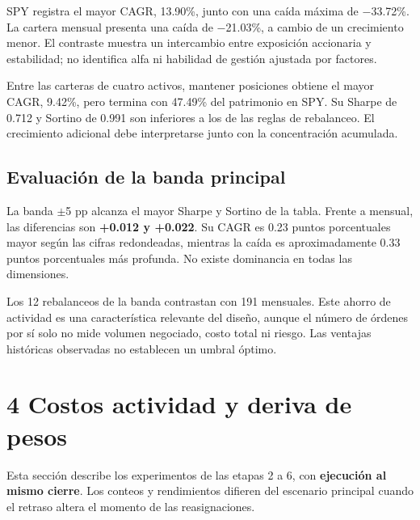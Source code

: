 \documentclass[11pt,letterpaper]{article}
\begin{document}
SPY registra el mayor CAGR, 13.90\%, junto con una caída máxima de \ensuremath{-}33.72\%. La cartera mensual presenta una caída de \ensuremath{-}21.03\%, a cambio de un crecimiento menor. El contraste muestra un intercambio entre exposición accionaria y estabilidad; no identifica alfa ni habilidad de gestión ajustada por factores.

Entre las carteras de cuatro activos, mantener posiciones obtiene el mayor CAGR, 9.42\%, pero termina con 47.49\% del patrimonio en SPY. Su Sharpe de 0.712 y Sortino de 0.991 son inferiores a los de las reglas de rebalanceo. El crecimiento adicional debe interpretarse junto con la concentración acumulada.

\subsection*{Evaluación de la banda principal}

La banda \ensuremath{\pm}5 pp alcanza el mayor Sharpe y Sortino de la tabla. Frente a mensual, las diferencias son \textbf{+0.012 y +0.022}. Su CAGR es 0.23 puntos porcentuales mayor según las cifras redondeadas, mientras la caída es aproximadamente 0.33 puntos porcentuales más profunda. No existe dominancia en todas las dimensiones.

Los 12 rebalanceos de la banda contrastan con 191 mensuales. Este ahorro de actividad es una característica relevante del diseño, aunque el número de órdenes por sí solo no mide volumen negociado, costo total ni riesgo. Las ventajas históricas observadas no establecen un umbral óptimo.


\clearpage

\section*{4 Costos actividad y deriva de pesos}

Esta sección describe los experimentos de las etapas 2 a 6, con \textbf{ejecución al mismo cierre}. Los conteos y rendimientos difieren del escenario principal cuando el retraso altera el momento de las reasignaciones.

\begingroup
\fontsize{10}{12.0}\selectfont

\end{document}
